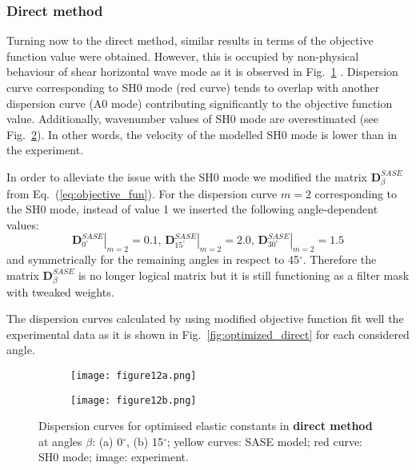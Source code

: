 \documentclass[preprint,12pt]{elsarticle}
\newcommand{\matr}[1]{\mathbf{#1}} %
\begin{document}
\clearpage
\subsubsection{Direct method}
Turning now to the direct method, similar results in terms of the objective function value were obtained.  However, this is occupied by non-physical behaviour of shear horizontal wave mode as it is observed in Fig.~\ref{fig:dispersion0deg_direct_SH0} . Dispersion curve corresponding to SH0 mode (red curve) tends to overlap with another dispersion curve (A0 mode) contributing significantly to the objective function value. Additionally, wavenumber values of SH0 mode are overestimated (see Fig.~\ref{fig:dispersion15deg_direct_SH0}). In other words, the velocity of the modelled SH0 mode is lower than in the experiment.

In order to alleviate the issue with the SH0 mode we modified the matrix 
\(\matr{D}^{SASE}_{\beta} \)  from Eq.~(\ref{eq:objective_fun}). For the dispersion 
curve 
\(m=2\) corresponding to the SH0 mode, instead of value 1 we inserted the following 
angle-dependent values:
\begin{equation}
\left. \matr{D}^{SASE}_{0^{\circ}}\right\vert_{m=2} = 0.1, \, \left. \matr{D}^{SASE}_{15^{\circ}}\right\vert_{m=2} = 2.0, \, \left. \matr{D}^{SASE}_{30^{\circ}}\right\vert_{m=2} = 1.5
\label{eq:objective_fun_mod}
\end{equation}	
and symmetrically for the remaining angles in respect to 45\(^{\circ}\). Therefore the 
matrix \(\matr{D}^{SASE}_{\beta} \) is no longer logical matrix but it is still functioning 
as 
a filter mask with tweaked weights.

The dispersion curves calculated by using modified objective function fit well the experimental data as it is shown in Fig.~\ref{fig:optimized_direct} for each considered angle. 
\begin{figure} [h!]
	\centering
	\begin{subfigure}[b]{\textwidth}
		\centering
		\texttt{[image: figure12a.png]}
		\caption{}
		\label{fig:dispersion0deg_direct_SH0}
	\end{subfigure}
	\begin{subfigure}[b]{\textwidth}
		\centering
		\texttt{[image: figure12b.png]}
		\caption{}
		\label{fig:dispersion15deg_direct_SH0}
	\end{subfigure}
	\caption{Dispersion curves for optimised elastic constants in \textbf{direct method} 
	at angles \(\beta\): (a) 0\(^{\circ}\), (b) 15\(^{\circ}\); yellow curves: SASE model; red 
	curve: SH0 mode; image: experiment. }
	\label{fig:SH0_problem}
\end{figure}
\end{document}
